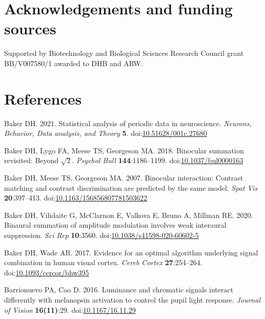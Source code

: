 \documentclass[
]{article}
\newlength{\cslhangindent}
\newlength{\cslentryspacingunit} %
\newenvironment{CSLReferences}[2] %
 {%
  \setlength{\parindent}{0pt}
  \ifodd #1
  \let\oldpar\par
  \def\par{\hangindent=\cslhangindent\oldpar}
  \fi
  \setlength{\parskip}{#2\cslentryspacingunit}
 }%
 {}
\begin{document}
\hypertarget{acknowledgements-and-funding-sources}{%
\section{Acknowledgements and funding sources}\label{acknowledgements-and-funding-sources}}

Supported by Biotechnology and Biological Sciences Research Council grant BB/V007580/1 awarded to DHB and ARW.

\hypertarget{references}{%
\section{References}\label{references}}

\hypertarget{refs}{}
\begin{CSLReferences}{1}{0}
\leavevmode{}%
Baker DH. 2021. Statistical analysis of periodic data in neuroscience. \emph{Neurons, Behavior, Data analysis, and Theory} \textbf{5}. doi:\href{https://doi.org/10.51628/001c.27680}{10.51628/001c.27680}

\leavevmode{}%
Baker DH, Lygo FA, Meese TS, Georgeson MA. 2018. Binocular summation revisited: Beyond \(\sqrt{2}\). \emph{Psychol Bull} \textbf{144}:1186--1199. doi:\href{https://doi.org/10.1037/bul0000163}{10.1037/bul0000163}

\leavevmode{}%
Baker DH, Meese TS, Georgeson MA. 2007. Binocular interaction: Contrast matching and contrast discrimination are predicted by the same model. \emph{Spat Vis} \textbf{20}:397--413. doi:\href{https://doi.org/10.1163/156856807781503622}{10.1163/156856807781503622}

\leavevmode{}%
Baker DH, Vilidaite G, McClarnon E, Valkova E, Bruno A, Millman RE. 2020. Binaural summation of amplitude modulation involves weak interaural suppression. \emph{Sci Rep} \textbf{10}:3560. doi:\href{https://doi.org/10.1038/s41598-020-60602-5}{10.1038/s41598-020-60602-5}

\leavevmode{}%
Baker DH, Wade AR. 2017. Evidence for an optimal algorithm underlying signal combination in human visual cortex. \emph{Cereb Cortex} \textbf{27}:254--264. doi:\href{https://doi.org/10.1093/cercor/bhw395}{10.1093/cercor/bhw395}

\leavevmode{}%
Barrionuevo PA, Cao D. 2016. Luminance and chromatic signals interact differently with melanopsin activation to control the pupil light response. \emph{Journal of Vision} \textbf{16(11)}:29. doi:\href{https://doi.org/10.1167/16.11.29}{10.1167/16.11.29}


\end{CSLReferences}
\end{document}
